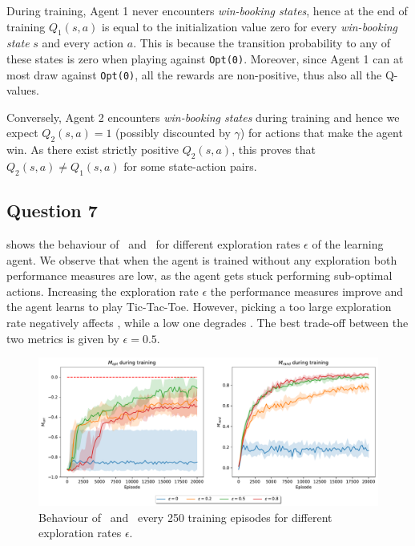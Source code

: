 \documentclass[10pt]{IEEEtran}
\begin{document}
During training, Agent 1 never encounters \emph{win-booking states}, hence at the end of training $Q_1(s,a)$ is equal to the initialization value zero for every \emph{win-booking state} $s$ and every action $a$. This is because the transition probability to any of these states is zero when playing against \texttt{Opt(0)}. Moreover, since Agent 1 can at most draw against \texttt{Opt(0)}, all the rewards are non-positive,  thus also all the Q-values. 

Conversely, Agent 2 encounters \emph{win-booking states} during training and hence we expect $Q_2(s,a) = 1$ (possibly discounted by $\gamma$) for actions that make the agent win. As there exist strictly positive $Q_2(s,a)$, this proves that $Q_2(s,a) \neq Q_1(s,a)$ for some state-action pairs.


\subsection*{Question 7}
 shows the behaviour of \mopt\ and \mrand\ for different exploration rates $\epsilon$ of the learning agent. We observe that when the agent is trained without any exploration both performance measures are low, as the agent gets stuck performing sub-optimal actions. Increasing the exploration rate $\epsilon$ the performance measures improve and the agent learns to play Tic-Tac-Toe. However, picking a too large exploration rate negatively affects \mopt, while a low one degrades \mrand. The best trade-off between the two metrics is given by $\epsilon = 0.5$.
\begin{figure}[h]
    \centering
    \includegraphics[width=\linewidth]{code/figures/performance_epsilon_self.pdf}
    \caption{Behaviour of \mopt\ and \mrand\ every 250 training episodes for different exploration rates $\epsilon$.}
    \label{plot_question7}
\end{figure}
\end{document}
